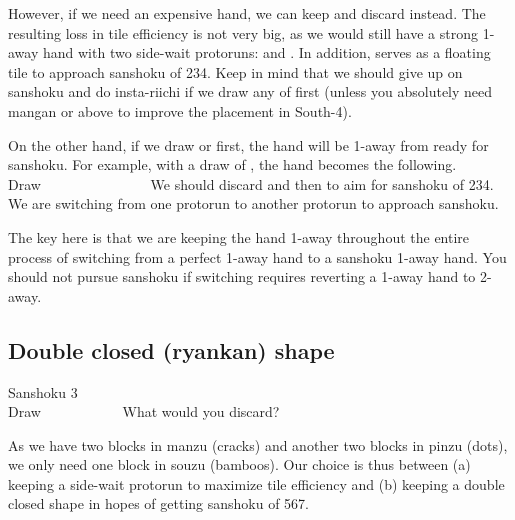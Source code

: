 \bigskip
However, if we need an expensive hand, we can keep {\LARGE{}} and discard {\LARGE{}} instead. The resulting loss in tile efficiency is not very big, as we would still have a strong 1-away hand with two side-wait protoruns: {\LARGE{}} and {\LARGE{}}. In addition, {\LARGE{}} serves as a floating tile to approach {\jap sanshoku} of 234. 
Keep in mind that we should give up on {\jap sanshoku} and do insta-riichi if we draw any of {\LARGE{}} first (unless you absolutely need {\jap mangan} or above to improve the placement in South-4). 

\bigskip
On the other hand, if we draw {\LARGE{}} or {\LARGE{}} first, the hand will be 1-away from ready for {\jap sanshoku}. For example, with a draw of {\LARGE{}}, the hand becomes the following. 
\bp
{}~\\
\hfill\footnotesize{Draw~~~~~~~~~~~~~~~}
\ep
We should discard {\LARGE{}} and then {\LARGE{}} to aim for {\jap sanshoku} of 234. We are switching from one protorun {\LARGE{}} to another protorun {\LARGE{}} to approach {\jap sanshoku}. 

\bigskip
The key here is that we are keeping the hand 1-away throughout the entire process of switching from a perfect 1-away hand to a {\jap sanshoku} 1-away hand. You should not pursue {\jap sanshoku} if switching requires reverting a 1-away hand to 2-away. 


\bigskip
\subsection{Double closed ({\jap ryankan}) shape}\label{sec:san3}

\begin{itembox}[r]{{\jap Sanshoku} 3}
\bp
{}~\\
\hfill\footnotesize{Draw~~~~~~~~~~~}
\ep
\vspace{-17pt}What would you discard? \vspace{-5pt}
\end{itembox}
\noindent
As we have two blocks in {\jap manzu} (cracks) and another two blocks in {\jap pinzu} (dots), we only need one block in {\jap souzu} (bamboos). Our choice is thus between (a) keeping a side-wait protorun {\LARGE{}} to maximize tile efficiency and (b) keeping a double closed shape {\LARGE{}} in hopes of getting {\jap sanshoku} of 567. 

